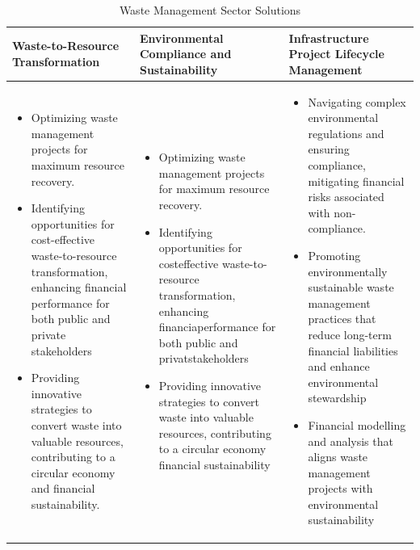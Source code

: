 \begin{table}[H]
    \centering
    \caption{Waste Management Sector Solutions}
    \label{tab2}
    \begin{tabular}{|>{\raggedright\arraybackslash}p{4.5cm}|>{\raggedright\arraybackslash}p{4.5cm}|>{\raggedright\arraybackslash}p{4.5cm}|}
        \hline
        \rowcolor[gray]{0.8}
        \textbf{Waste-to-Resource Transformation} & \textbf{Environmental Compliance and Sustainability} & \textbf{Infrastructure Project Lifecycle Management} \\ \hline
        \begin{itemize}
            \item Optimizing waste management projects for maximum resource recovery.
            \item Identifying opportunities for cost-effective waste-to-resource transformation, enhancing financial performance for both public and private stakeholders
            \item Providing innovative strategies to convert waste into valuable resources, contributing to a circular economy and financial sustainability.
        \end{itemize}
        &
        \begin{itemize}
            \item Optimizing waste management projects for maximum resource recovery.
            \item Identifying opportunities for costeffective waste-to-resource transformation, enhancing financiaperformance for both public and privatstakeholders
            \item Providing innovative strategies to convert waste into valuable resources, contributing to a circular economy  financial sustainability
        \end{itemize}
        &
        \begin{itemize}
            \item Navigating complex environmental regulations and ensuring compliance, mitigating financial risks associated with non-compliance.
            \item Promoting environmentally sustainable waste management practices that reduce long-term financial liabilities and enhance environmental stewardship
            \item Financial modelling and analysis that aligns waste management projects with environmental sustainability
        \end{itemize} \\ \hline
    \end{tabular}
\end{table}

